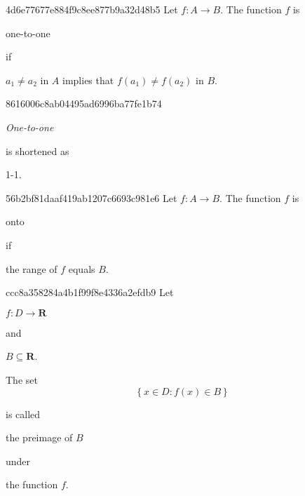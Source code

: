 \begin{note}{4d6e77677e884f9c8ee877b9a32d48b5}
    Let \({ f : A \to B }\). The function \({ f }\) is \begin{icloze}{2}one-to-one\end{icloze} if
    \begin{icloze}{1}
        \begin{center}
            \({ a_1 \neq a_2 }\) in \({ A }\) implies that \({ f(a_1) \neq f(a_2) }\) in \({ B }\).
        \end{center}
    \end{icloze}
\end{note}

\begin{note}{8616006c8ab04495ad6996ba77fe1b74}
    \begin{icloze}{2}\textit{One-to-one}\end{icloze} is shortened as \begin{icloze}{1}1-1.\end{icloze}
\end{note}

\begin{note}{56b2bf81daaf419ab1207c6693c981e6}
    Let \({ f : A \to B }\). The function \({ f }\) is \begin{icloze}{2}onto\end{icloze} if
    \begin{icloze}{1}
        \begin{center}
            the range of \({ f }\) equals \({ B }\).
        \end{center}
    \end{icloze}
\end{note}

\begin{note}{ccc8a358284a4b1f99f8e4336a2efdb9}
    Let \begin{icloze}{4}\({ f : D \to \mathbf{R} }\)\end{icloze} and \begin{icloze}{3}\({ B \subseteq \mathbf{R} }\).\end{icloze}
    \begin{icloze}{2}
        The set
        \[
            \left\{ x \in D : f(x) \in B \right\}
        \]
    \end{icloze}
    is called \begin{icloze}{1}the preimage of \({ B }\)\end{icloze} \begin{icloze}{5}under\end{icloze} the function \({ f }\).
\end{note}

